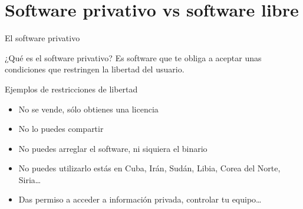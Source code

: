 \documentclass{beamer}
\begin{document}
\section{Software privativo vs software libre}

\begin{frame}{El software privativo}

  \begin{block}{¿Qué es el software privativo?}
    Es software que te obliga a aceptar unas condiciones que restringen la libertad del     usuario.
  \end{block}
  \pause
  \begin{alertblock}{Ejemplos de restricciones de libertad}
    \begin{itemize}
    \item No se vende, sólo obtienes una licencia
    \item No lo puedes compartir
    \item No puedes arreglar el software, ni siquiera el binario
    \item No puedes utilizarlo estás en Cuba, Irán, Sudán, Libia,             Corea del Norte,       Siria\ldots
    \item Das permiso a acceder a información privada, controlar tu             equipo\ldots
    \end{itemize}
    
  \end{alertblock}
\end{frame}
\end{document}
